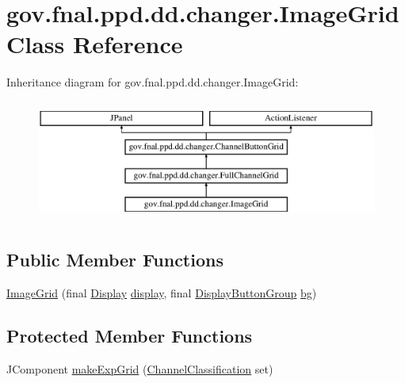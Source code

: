 \hypertarget{classgov_1_1fnal_1_1ppd_1_1dd_1_1changer_1_1ImageGrid}{\section{gov.\-fnal.\-ppd.\-dd.\-changer.\-Image\-Grid Class Reference}
\label{classgov_1_1fnal_1_1ppd_1_1dd_1_1changer_1_1ImageGrid}
}
Inheritance diagram for gov.\-fnal.\-ppd.\-dd.\-changer.\-Image\-Grid\-:\begin{figure}[H]
\begin{center}
\leavevmode
\includegraphics[height=4.000000cm]{classgov_1_1fnal_1_1ppd_1_1dd_1_1changer_1_1ImageGrid}
\end{center}
\end{figure}
\subsection*{Public Member Functions}
\begin{DoxyCompactItemize}
\item 
\hyperlink{classgov_1_1fnal_1_1ppd_1_1dd_1_1changer_1_1ImageGrid_a34570a94e8247dd356c8212d43979788}{Image\-Grid} (final \hyperlink{interfacegov_1_1fnal_1_1ppd_1_1dd_1_1signage_1_1Display}{Display} \hyperlink{classgov_1_1fnal_1_1ppd_1_1dd_1_1changer_1_1ChannelButtonGrid_a3c06b51489dcaacd16f6efcefe06bcaa}{display}, final \hyperlink{classgov_1_1fnal_1_1ppd_1_1dd_1_1util_1_1specific_1_1DisplayButtonGroup}{Display\-Button\-Group} \hyperlink{classgov_1_1fnal_1_1ppd_1_1dd_1_1changer_1_1ChannelButtonGrid_adf258a89161282e5215b4642ecbec812}{bg})
\end{DoxyCompactItemize}
\subsection*{Protected Member Functions}
\begin{DoxyCompactItemize}
\item 
J\-Component \hyperlink{classgov_1_1fnal_1_1ppd_1_1dd_1_1changer_1_1ImageGrid_abc159f4865dd5542cfa75bdbbda1bd30}{make\-Exp\-Grid} (\hyperlink{classgov_1_1fnal_1_1ppd_1_1dd_1_1changer_1_1ChannelClassification}{Channel\-Classification} set)
\end{DoxyCompactItemize}
